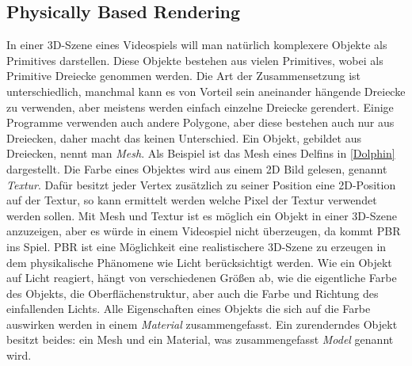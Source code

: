 \subsection{Physically Based Rendering}

In einer 3D-Szene eines Videospiels will man natürlich komplexere Objekte als Primitives darstellen. Diese Objekte bestehen aus vielen Primitives, wobei als Primitive Dreiecke genommen werden. Die Art der Zusammensetzung ist unterschiedlich, manchmal kann es von Vorteil sein aneinander hängende Dreiecke zu verwenden, aber meistens werden einfach einzelne Dreiecke gerendert. Einige Programme verwenden auch andere Polygone, aber diese bestehen auch nur aus Dreiecken, daher macht das keinen Unterschied. Ein Objekt, gebildet aus Dreiecken, nennt man \textit{Mesh}. Als Beispiel ist das Mesh eines Delfins in \cref{Dolphin} dargestellt. Die Farbe eines Objektes wird aus einem 2D Bild gelesen, genannt \textit{Textur}. Dafür besitzt jeder Vertex zusätzlich zu seiner Position eine 2D-Position auf der Textur, so kann ermittelt werden welche Pixel der Textur verwendet werden sollen. Mit Mesh und Textur ist es möglich ein Objekt in einer 3D-Szene anzuzeigen, aber es würde in einem Videospiel nicht überzeugen, da kommt \ac{PBR} ins Spiel. \ac{PBR} ist eine Möglichkeit eine realistischere 3D-Szene zu erzeugen in dem physikalische Phänomene wie Licht berücksichtigt werden. Wie ein Objekt auf Licht reagiert, hängt von verschiedenen Größen ab, wie die eigentliche Farbe des Objekts, die Oberflächenstruktur, aber auch die Farbe und Richtung des einfallenden Lichts. Alle Eigenschaften eines Objekts die sich auf die Farbe auswirken werden in einem \textit{Material} zusammengefasst. Ein zurenderndes  Objekt besitzt beides: ein Mesh und ein Material, was zusammengefasst \textit{Model} genannt wird.

